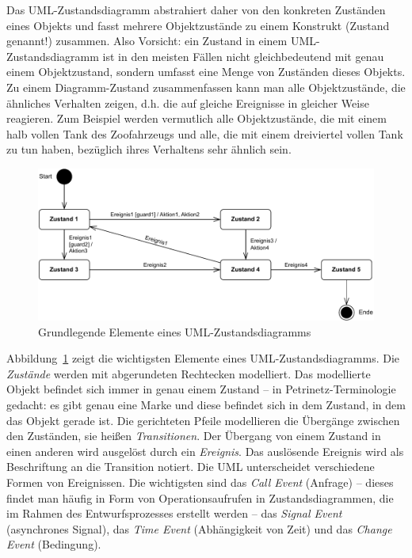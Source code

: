 Das UML-Zustandsdiagramm 
abstrahiert daher von den konkreten Zuständen eines Objekts und fasst mehrere Objektzustände zu einem Konstrukt (Zustand genannt!) zusammen. Also Vorsicht: ein Zustand in einem UML-Zustandsdiagramm ist in den meisten Fällen nicht gleichbedeutend mit genau einem Objektzustand, sondern umfasst eine Menge von Zuständen dieses Objekts. Zu einem Diagramm-Zustand zusammenfassen kann man alle Objektzustände, die ähnliches Verhalten zeigen, d.h. die auf gleiche Ereignisse in gleicher Weise reagieren. Zum Beispiel werden vermutlich alle Objektzustände, die mit einem halb vollen Tank des Zoofahrzeugs und alle, die mit einem dreiviertel vollen Tank zu tun haben, bezüglich ihres Verhaltens sehr ähnlich sein. 

\vspace{\baselineskip} %

\begin{figure}[!htbp]
	\centering
	\includegraphics[scale=0.7]{Bilder/Kapitel-5/uml_zustandsdiagramm.pdf}
	\caption{Grundlegende Elemente eines UML-Zustandsdiagramms}
	\label{fig:uml_zustandsdiagramm}
\end{figure}

\vspace{\baselineskip} %

Abbildung~\ref{fig:uml_zustandsdiagramm} zeigt die wichtigsten Elemente eines UML-Zustandsdiagramms. 
Die \textit{Zustände} werden mit abgerundeten Rechtecken modelliert. Das modellierte Objekt befindet sich immer in genau einem Zustand -- in Petrinetz-Terminologie gedacht: es gibt genau eine Marke und diese befindet sich in dem Zustand, in dem das Objekt gerade ist. Die gerichteten Pfeile modellieren die Übergänge zwischen den Zuständen, sie heißen \textit{Transitionen}.
Der Übergang von einem Zustand in einen anderen wird ausgelöst durch ein \textit{Ereignis}. Das auslösende Ereignis wird als Beschriftung an die Transition notiert. Die UML unterscheidet verschiedene Formen von Ereignissen. Die wichtigsten sind das \textit{Call Event} (Anfrage) -- dieses findet man häufig in Form von Operationsaufrufen in Zustandsdiagrammen, die im Rahmen des Entwurfsprozesses erstellt werden -- das \textit{Signal Event} (asynchrones Signal), das \textit{Time Event} (Abhängigkeit von Zeit) und das \textit{Change Event} (Bedingung).

